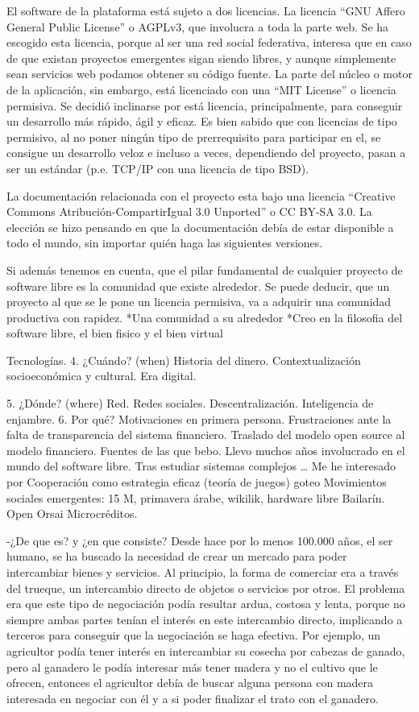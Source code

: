 El software de la plataforma  está sujeto a dos licencias. La licencia ``GNU Affero General Public License'' o AGPLv3, que involucra a toda la parte web. Se ha escogido esta licencia, porque al ser una red social federativa, interesa que en caso de que existan proyectos emergentes sigan siendo libres, y aunque simplemente sean servicios web podamos obtener su código fuente. La parte del núcleo o motor de la aplicación, sin embargo, está licenciado con una ``MIT License'' o licencia permisiva. Se decidió inclinarse por está licencia, principalmente, para conseguir un desarrollo más rápido, ágil y eficaz. Es bien sabido que con licencias de tipo permisivo, al no poner ningún tipo de prerrequisito para participar en el, se consigue un desarrollo veloz e incluso a veces, dependiendo del proyecto, pasan a ser un estándar (p.e. TCP/IP con una licencia de tipo BSD). 

La documentación relacionada con el proyecto esta bajo una licencia ``Creative Commons Atribución-CompartirIgual 3.0 Unported'' o CC BY-SA 3.0. La elección se hizo pensando en que la documentación debía de estar disponible a todo el mundo, sin importar quién haga las siguientes versiones.


Si además tenemos en cuenta, que el pilar fundamental de cualquier proyecto de software libre es la comunidad que existe alrededor. Se puede deducir, que un proyecto al que se le pone un licencia permisiva, va a adquirir una comunidad productiva con rapidez.
*Una comunidad a su alrededor
*Creo en la filosofia del software libre, el bien fisico y el bien virtual

Tecnologías.
4. ¿Cuándo? (when) 
Historia del dinero.
Contextualización socioeconómica y cultural. Era digital.

5. ¿Dónde? (where) 
Red. Redes sociales.
Descentralización. Inteligencia de enjambre.
6. Por qué?
Motivaciones en primera persona.
Frustraciones ante la falta de transparencia del sistema financiero.
Traslado del modelo open source al modelo financiero. 
Fuentes de las que bebo.
Llevo muchos años involucrado en el mundo del software libre.
Tras estudiar sistemas complejos … 
Me he interesado por Cooperación como estrategia eficaz (teoría de juegos)
goteo
Movimientos sociales emergentes: 15 M, primavera  árabe, wikilik, hardware libre
Bailarín.
Open 
Orsai 
Microcréditos.



-¿De que es? y ¿en que consiste?
Desde hace por lo menos 100.000 años, el ser humano, se ha buscado la necesidad de crear un mercado para poder intercambiar bienes y servicios. Al principio, la forma de comerciar era a través del trueque, un intercambio directo de objetos o servicios por otros. El problema era que este tipo de negociación podía resultar ardua, costosa y lenta, porque no siempre ambas partes tenían el interés en este intercambio directo, implicando a terceros para conseguir que la negociación se haga efectiva. Por ejemplo, un agricultor podía tener interés en intercambiar su cosecha por cabezas de ganado, pero al ganadero le podía interesar más tener madera y no el cultivo que le ofrecen, entonces el agricultor debía de buscar alguna persona con madera interesada en negociar con él y a si poder finalizar el trato con el ganadero. 

